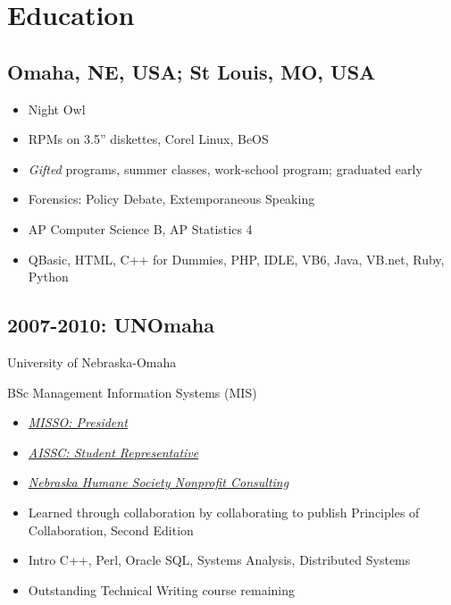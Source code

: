 \documentclass[letter,,openany,oneside]{sphinxhowto}
\begin{document}
\section{Education}
\label{resume:education}

\subsection{Omaha, NE, USA; St Louis, MO, USA}
\label{resume:omaha-ne-usa-st-louis-mo-usa}\begin{itemize}
\item {} 
Night Owl

\item {} 
RPMs on 3.5'' diskettes, Corel Linux, BeOS

\item {} 
\emph{Gifted} programs, summer classes, work-school program; graduated early

\item {} 
Forensics: Policy Debate, Extemporaneous Speaking

\item {} 
AP Computer Science B, AP Statistics 4

\item {} 
QBasic, HTML, C++ for Dummies, PHP, IDLE, VB6, Java, VB.net, Ruby, Python

\end{itemize}


\subsection{2007-2010: UNOmaha}
\label{resume:unomaha}
\begin{DUlineblock}{0em}
\item[] University of Nebraska-Omaha
\item[] BSc Management Information Systems (MIS)
\end{DUlineblock}
\begin{itemize}
\item {} 
{\hyperref[resume:uno-misso-president]{\emph{MISSO: President}}}

\item {} 
{\hyperref[resume:ais-student-chapters-representative]{\emph{AISSC: Student Representative}}}

\item {} 
{\hyperref[resume:id2]{\emph{Nebraska Humane Society Nonprofit Consulting}}}

\item {} 
Learned through collaboration by collaborating to publish
Principles of Collaboration, Second Edition

\item {} 
Intro C++, Perl, Oracle SQL, Systems Analysis, Distributed Systems

\item {} 
Outstanding Technical Writing course remaining

\end{itemize}
\label{resume:uno-misso-president}\label{resume:misso-president}\label{resume:ais-student-chapters-representative}\label{resume:aissc-student-representative}
\end{document}

